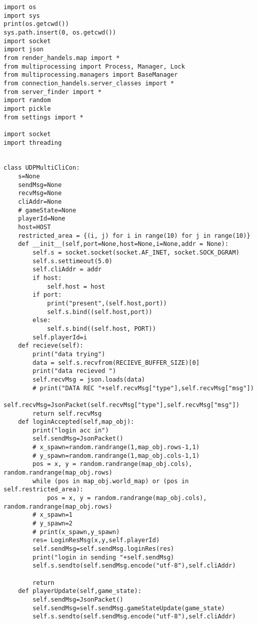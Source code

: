         \begin{lstlisting}[style=pythonstyle, caption=server code UDP]
            import os
import sys
print(os.getcwd())
sys.path.insert(0, os.getcwd())
import socket
import json
from render_handels.map import *
from multiprocessing import Process, Manager, Lock
from multiprocessing.managers import BaseManager
from connection_handels.server_classes import *
from server_finder import *
import random
import pickle
from settings import * 

import socket
import threading


class UDPMultiCliCon:
    s=None
    sendMsg=None
    recvMsg=None
    cliAddr=None
    # gameState=None
    playerId=None
    host=HOST
    restricted_area = {(i, j) for i in range(10) for j in range(10)}
    def __init__(self,port=None,host=None,i=None,addr = None):
        self.s = socket.socket(socket.AF_INET, socket.SOCK_DGRAM)
        self.s.settimeout(5.0)
        self.cliAddr = addr
        if host:
            self.host = host
        if port:
            print("present",(self.host,port))
            self.s.bind((self.host,port))
        else:
            self.s.bind((self.host, PORT))
        self.playerId=i
    def recieve(self):
        print("data trying")
        data = self.s.recvfrom(RECIEVE_BUFFER_SIZE)[0]
        print("data recieved ")
        self.recvMsg = json.loads(data)
        # print("DATA REC "+self.recvMsg["type"],self.recvMsg["msg"])
        self.recvMsg=JsonPacket(self.recvMsg["type"],self.recvMsg["msg"])
        return self.recvMsg
    def loginAccepted(self,map_obj):
        print("login acc in")
        self.sendMsg=JsonPacket()
        # x_spawn=random.randrange(1,map_obj.rows-1,1)
        # y_spawn=random.randrange(1,map_obj.cols-1,1)
        pos = x, y = random.randrange(map_obj.cols), random.randrange(map_obj.rows)
        while (pos in map_obj.world_map) or (pos in self.restricted_area):
            pos = x, y = random.randrange(map_obj.cols), random.randrange(map_obj.rows)
        # x_spawn=1
        # y_spawn=2
        # print(x_spawn,y_spawn)
        res= LoginResMsg(x,y,self.playerId)
        self.sendMsg=self.sendMsg.loginRes(res)
        print("login in sending "+self.sendMsg)
        self.s.sendto(self.sendMsg.encode("utf-8"),self.cliAddr)

        return
    def playerUpdate(self,game_state):
        self.sendMsg=JsonPacket()
        self.sendMsg=self.sendMsg.gameStateUpdate(game_state)
        self.s.sendto(self.sendMsg.encode("utf-8"),self.cliAddr)


\end{lstlisting}
